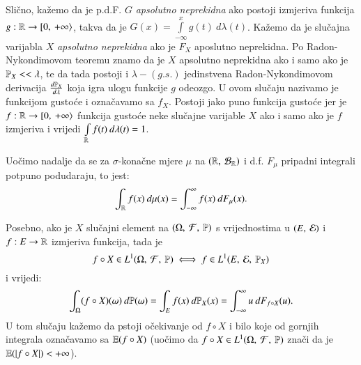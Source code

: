 Sli\v cno, ka\v zemo da je p.d.F. $G$ \emph{apsolutno neprekidna} ako postoji izmjeriva funkcija $g : \mathbb{R} \to [ {0}, \: {+\infty} \rangle$, takva da je $G(x) = \int\limits_{-\infty}^{x} g(t) \: d \lambda (t)$.
Ka\v zemo da je slu\v cajna varijabla $X$ \emph{apsolutno neprekidna} ako je $F_X$ aposlutno neprekidna.
Po Radon-Nykondimovom teoremu znamo da je $X$ apsolutno neprekidna ako i samo ako je $\mathbb{P}_X << \lambda$, te da tada postoji i $\lambda-(g.s.)$ jedinstvena Radon-Nykondimovom derivacija $\frac{d \mathbb{P}_X}{d \lambda}$ koja igra ulogu funkcije $g$ odeozgo.
U ovom slu\v caju nazivamo je funkcijom gusto\' ce i ozna\v cavamo sa $f_X$.
Postoji jako puno funkcija gusto\' ce jer je $f: \mathbb{R} \to [ {0}, \: {+\infty} \rangle$ funkcija gusto\' ce neke slu\v cajne varijable $X$ ako i samo ako je $f$ izmjeriva i vrijedi $\int\limits_{\mathbb{R}} f(t) \: d \lambda (t) = 1$.

Uo\v cimo nadalje da se za $\sigma$-kona\v cne mjere $\mu$ na $({\mathbb{R}}, \: {\mathcal{B}_{\mathbb{R}}})$ i d.f. $F_{\mu}$ pripadni integrali potpuno podudaraju, to jest:
\begin{equation*}
    \int_{\mathbb{R}} f(x) \: d \mu (x) = \int_{-\infty}^{\infty} f(x) \: d F_{\mu} (x).
\end{equation*}

Posebno, ako je $X$ slu\v cajni element na $(\Omega, \: \mathcal{F}, \: \mathbb{P})$ s vrijednostima u $({E}, \: {\mathcal{E}})$ i $f:E \to \mathbb{R}$ izmjeriva funkcija, tada je
\begin{equation*}
    f \circ X \in L^1 (\Omega, \: \mathcal{F}, \: \mathbb{P}) \iff f \in L^1 (E, \: \mathcal{E}, \: \mathbb{P}_X)
\end{equation*}
i vrijedi:
\begin{equation*}
    \int_{\Omega} (f \circ X) (\omega) \: d \mathbb{P} (\omega) = \int_E f(x) \: d \mathbb{P}_X (x) = \int_{-\infty}^{\infty} u \: d F_{f \circ X} (u).
\end{equation*}
U tom slu\v caju ka\v zemo da pstoji o\v cekivanje od $f \circ X$ i bilo koje od gornjih integrala ozna\v cavamo sa $\mathbb{E}({f \circ X})$
(uo\v cimo da $f \circ X \in L^1 (\Omega, \: \mathcal{F}, \: \mathbb{P})$ zna\v ci da je $\mathbb{E}({|f \circ X|}) < +\infty$).

